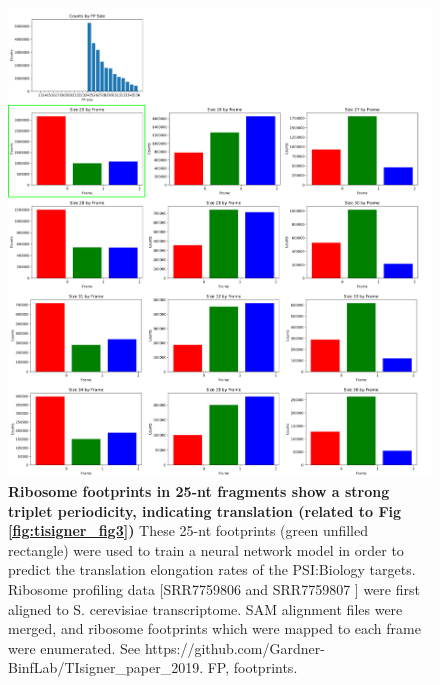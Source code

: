 \begin{figure}[htbp!]
	\center
	\includegraphics[width=1\textwidth]{appendix/TIsigner/Figs/S8.png}
	\caption[Ribosome footprints in 25-nt fragments show a strong triplet periodicity, indicating translation (related to Fig \ref{fig:tisigner_fig3})]{\textbf{Ribosome footprints in 25-nt fragments show a strong triplet periodicity, indicating translation (related to Fig \ref{fig:tisigner_fig3})}  These 25-nt footprints (green unfilled rectangle) were used to train a neural network model \cite{Tunney2018-sr} in order to predict the translation elongation rates of the PSI:Biology targets. Ribosome profiling data [SRR7759806 and SRR7759807 \cite{Mohammad2019-if}] were first aligned to S. cerevisiae transcriptome. SAM alignment files were merged, and ribosome footprints which were mapped to each frame were enumerated. See https://github.com/Gardner-BinfLab/TIsigner\_paper\_2019. FP, footprints. 
	}%
	\label{fig:appendix_TIsigner_S8}
\end{figure}

